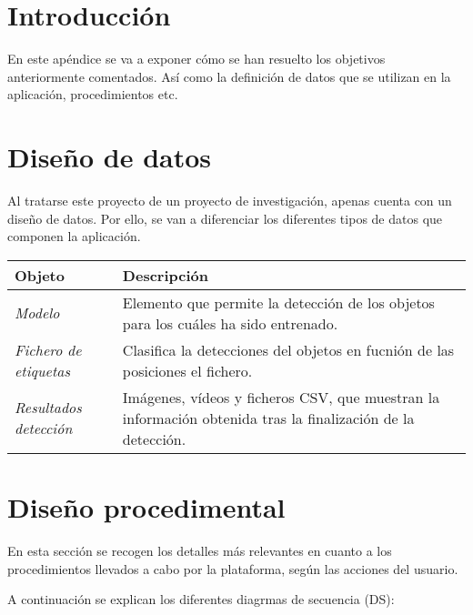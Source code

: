 
\section{Introducción}
En este apéndice se va a exponer cómo se han resuelto los objetivos anteriormente comentados. Así como la definición de datos que se utilizan en la aplicación, procedimientos etc.

\section{Diseño de datos}
Al tratarse este proyecto de un proyecto de investigación, apenas cuenta con un diseño de datos. Por ello, se van a diferenciar los diferentes tipos de datos que componen la aplicación.
\begin{table}[H]
    \centering
    \begin{tabular}{l p{5cm}}
        \toprule
        \textbf{Objeto} & \textbf{Descripción}\\
        \midrule
        \textit{Modelo} & Elemento que permite la detección de los objetos para los cuáles ha sido entrenado. \\
        \textit{Fichero de etiquetas} & Clasifica la detecciones del objetos en fucnión de las posiciones el fichero. \\
        \textit{Resultados detección} & Imágenes, vídeos y ficheros CSV, que muestran la información obtenida tras la finalización de la detección. \\
        \bottomrule
    \end{tabular}
\end{table}

\section{Diseño procedimental}

En esta sección se recogen los detalles más relevantes en cuanto a los procedimientos llevados a cabo por la plataforma, según las acciones del usuario.

A continuación se explican los diferentes diagrmas de secuencia (DS):

